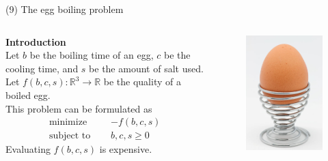 \documentclass[11pt, aspectratio=149]{beamer}
\theoremstyle{plain}
\begin{document}
\begin{frame}[fragile, t]{(9) The egg boiling problem}
	
	\begin{columns}
		\begin{column}{0.6\textwidth}
			\textbf{Introduction}\\ \vspace*{0.5em} 
			Let $b$ be the boiling time of an egg, $c$ be the cooling time, and $s$ be the amount of salt used.
			Let $f(b, c, s): \mathbb{R}^3 \to \mathbb{R}$ be the quality of a boiled egg.
			\\
			\vspace*{1em}
			This problem can be formulated as
			\begin{align*}
			\text{minimize } \quad & - f(b, c, s)  \\
			\text{subject to } \quad & b, c, s \geq 0 
			\end{align*}
			Evaluating $f(b, c, s)$ is expensive.
		\end{column}
		\begin{column}{0.4\textwidth}%
			\begin{figure}
				\centering
				\includegraphics[width=0.8\linewidth]{figs/egg}
			\end{figure}
		\end{column}
	\end{columns}
\end{frame}
\end{document}
